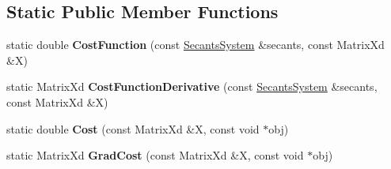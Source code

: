 \subsection*{Static Public Member Functions}
\begin{DoxyCompactItemize}
\item 
\hypertarget{struct_d_r_d_s_p_1_1_proj_secant_system_a69dac3dd0783981a641d7115028165c0}{static double {\bfseries Cost\-Function} (const \hyperlink{struct_d_r_d_s_p_1_1_secants_system}{Secants\-System} \&secants, const Matrix\-Xd \&X)}\label{struct_d_r_d_s_p_1_1_proj_secant_system_a69dac3dd0783981a641d7115028165c0}

\item 
\hypertarget{struct_d_r_d_s_p_1_1_proj_secant_system_a20c8477442964ff4304c455e537d0aa4}{static Matrix\-Xd {\bfseries Cost\-Function\-Derivative} (const \hyperlink{struct_d_r_d_s_p_1_1_secants_system}{Secants\-System} \&secants, const Matrix\-Xd \&X)}\label{struct_d_r_d_s_p_1_1_proj_secant_system_a20c8477442964ff4304c455e537d0aa4}

\item 
\hypertarget{struct_d_r_d_s_p_1_1_proj_secant_system_a079c799893a97957b2768bd9a1f95241}{static double {\bfseries Cost} (const Matrix\-Xd \&X, const void $\ast$obj)}\label{struct_d_r_d_s_p_1_1_proj_secant_system_a079c799893a97957b2768bd9a1f95241}

\item 
\hypertarget{struct_d_r_d_s_p_1_1_proj_secant_system_ab7a08c6ecb10ba5f179aa2cd34410997}{static Matrix\-Xd {\bfseries Grad\-Cost} (const Matrix\-Xd \&X, const void $\ast$obj)}\label{struct_d_r_d_s_p_1_1_proj_secant_system_ab7a08c6ecb10ba5f179aa2cd34410997}

\end{DoxyCompactItemize}
